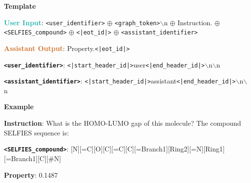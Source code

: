 \begin{tcolorbox}[colback=white!98!black,colframe=white!30!black,boxsep=1.1pt,top=6.75pt]%
\scriptsize
\noindent\makebox[\textwidth]{\rule{\textwidth}{1pt}}
\textbf{Template}
\\[-0.575em]
\noindent\makebox[\textwidth]{\rule{\textwidth}{1pt}}

\textbf{\textcolor[HTML]{20B2AA}{User Input}}: {\tt <user\_identifier>} $\oplus$ {\tt <graph\_token>}$\backslash$n $\oplus$ Instruction. $\oplus$ {\tt <SELFIES\_compound>} $\oplus$ {\tt <|eot\_id|>} $\oplus$ {\tt <assistant\_identifier>}

\textbf{\textcolor[HTML]{D2691E}{Assistant Output}}: Property.{\tt <|eot\_id|>}

{\tt \textbf{<user\_identifier>}}: {\tt <|start\_header\_id|>}user{\tt <|end\_header\_id|>}$\backslash$n$\backslash$n

{\tt \textbf{<assistant\_identifier>}}: {\tt <|start\_header\_id|>}assistant{\tt <|end\_header\_id|>}$\backslash$n$\backslash$n

\noindent\makebox[\textwidth]{\rule{\textwidth}{1pt}}
\textbf{Example}
\\[-0.575em]
\noindent\makebox[\textwidth]{\rule{\textwidth}{1pt}}

\begin{tcolorbox}[colback=cyan!7!white,colframe=white!98!black,boxsep=1.1pt,top=6.75pt]
\textbf{Instruction}: What is the HOMO-LUMO gap of this molecule? The compound SELFIES sequence is:

{\tt \textbf{<SELFIES\_compound>}}: [N][=C][O][C][=C][C][=Branch1][Ring2][=N][Ring1][=Branch1][C][\#N]


\end{tcolorbox}

\begin{tcolorbox}[colback=orange!7!white,colframe=white!98!black,boxsep=1.1pt,top=6.75pt]
\textbf{Property}: 0.1487
\end{tcolorbox}

\end{tcolorbox}


